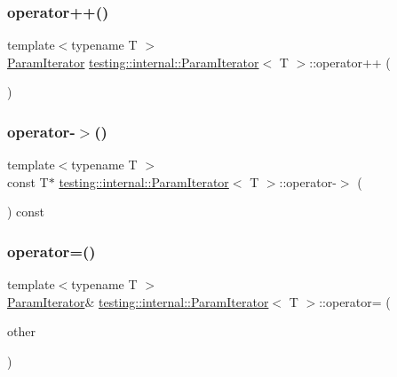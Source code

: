 \subsubsection{\texorpdfstring{operator++()}{operator++()}\hspace{0.1cm}{\footnotesize\ttfamily [2/2]}}
{\footnotesize\ttfamily template$<$typename T $>$ \\
\hyperlink{classtesting_1_1internal_1_1ParamIterator}{Param\+Iterator} \hyperlink{classtesting_1_1internal_1_1ParamIterator}{testing\+::internal\+::\+Param\+Iterator}$<$ T $>$\+::operator++ (\begin{DoxyParamCaption}\item[{int}]{ }\end{DoxyParamCaption})\hspace{0.3cm}{\ttfamily [inline]}}

\mbox{\label{classtesting_1_1internal_1_1ParamIterator_aad035d35e8f0c1412854959a94d4887e}} 
\subsubsection{\texorpdfstring{operator-\/$>$()}{operator->()}}
{\footnotesize\ttfamily template$<$typename T $>$ \\
const T$\ast$ \hyperlink{classtesting_1_1internal_1_1ParamIterator}{testing\+::internal\+::\+Param\+Iterator}$<$ T $>$\+::operator-\/$>$ (\begin{DoxyParamCaption}{ }\end{DoxyParamCaption}) const\hspace{0.3cm}{\ttfamily [inline]}}

\mbox{\label{classtesting_1_1internal_1_1ParamIterator_a8019f54ea1c66ca39ffdec47acfabfe6}} 
\subsubsection{\texorpdfstring{operator=()}{operator=()}}
{\footnotesize\ttfamily template$<$typename T $>$ \\
\hyperlink{classtesting_1_1internal_1_1ParamIterator}{Param\+Iterator}\& \hyperlink{classtesting_1_1internal_1_1ParamIterator}{testing\+::internal\+::\+Param\+Iterator}$<$ T $>$\+::operator= (\begin{DoxyParamCaption}\item[{const \hyperlink{classtesting_1_1internal_1_1ParamIterator}{Param\+Iterator}$<$ T $>$ \&}]{other }\end{DoxyParamCaption})\hspace{0.3cm}{\ttfamily [inline]}}

